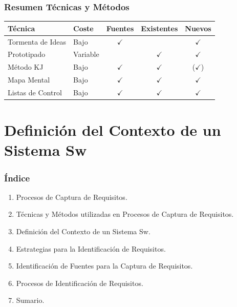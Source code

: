 ﻿\documentclass[handout,a4paper,slidestop,xcolor=pst,dvips,blue]{beamer}
\begin{document}
\begin{frame}[c]
    \frametitle{Resumen Técnicas y Métodos}
    \begin{center}
    \begin{tabular}{||l|l|c|c|c||}
        \hline \hline
        \textbf{Técnica}  & \textbf{Coste} & \textbf{Fuentes} & \textbf{Existentes} & \textbf{Nuevos} \\ \hline \hline
        Tormenta de Ideas & Bajo           & $\checkmark$     &                     & $\checkmark$    \\ \hline
        Prototipado       & Variable       &                  & $\checkmark$        & $\checkmark$    \\ \hline
        Método KJ         & Bajo           & $\checkmark$     & $\checkmark$        & ($\checkmark$)  \\ \hline
        Mapa Mental       & Bajo           & $\checkmark$     & $\checkmark$        & $\checkmark$  \\ \hline
        Listas de Control & Bajo           & $\checkmark$     & $\checkmark$        & $\checkmark$  \\ \hline \hline
    \end{tabular}
    \end{center}
\end{frame}

\section{Definición del Contexto de un Sistema Sw}

\begin{frame}[c]
    \frametitle{Índice}
    \begin{enumerate}
         \item Procesos de Captura de Requisitos.
         \item Técnicas y Métodos utilizadas en Procesos de Captura de Requisitos.
         \item \alert{Definición del Contexto de un Sistema Sw}.
         \item Estrategias para la Identificación de Requisitos.
         \item Identificación de Fuentes para la Captura de Requisitos.
         \item Procesos de Identificación de Requisitos.
         \item Sumario.
    \end{enumerate}
\end{frame}
\end{document}
